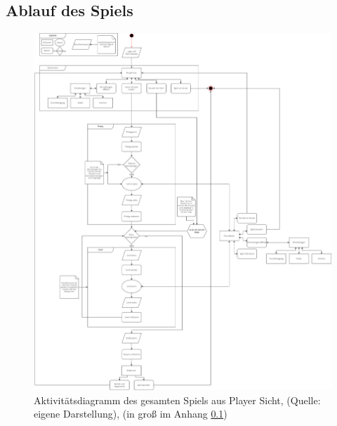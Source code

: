 \subsection{Ablauf des Spiels}
\begin{figure}[ht]
\centering
\includegraphics[width=1\linewidth]{content/pictures/GameLoop-Player.drawio.png}
\caption{Aktivitätsdiagramm des gesamten Spiels aus Player Sicht, (Quelle: eigene Darstellung), (in groß im Anhang \ref{})}
\label{fig:game-loop-player}
\end{figure}

